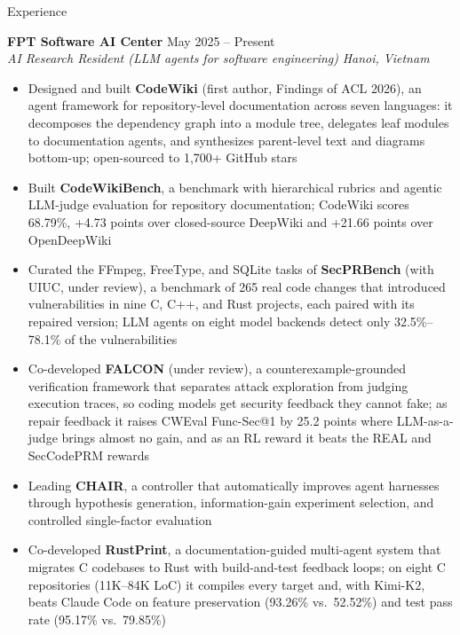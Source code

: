 \documentclass{resume} %
\begin{document}

\begin{rSection}{Experience}

\textbf{FPT Software AI Center} \hfill May 2025 -- Present\\
\textit{AI Research Resident (LLM agents for software engineering)}
\hfill \textit{Hanoi, Vietnam}

\begin{itemize}[leftmargin=1.5em,itemsep=0em,topsep=0.1em]
    \item Designed and built \textbf{CodeWiki} (first author, Findings of ACL
    2026), an agent framework for repository-level documentation across seven
    languages: it decomposes the dependency graph into a module tree, delegates
    leaf modules to documentation agents, and synthesizes parent-level text
    and diagrams bottom-up; open-sourced to 1,700+ GitHub stars
    \item Built \textbf{CodeWikiBench}, a benchmark with hierarchical rubrics
    and agentic LLM-judge evaluation for repository documentation; CodeWiki
    scores 68.79\%, +4.73 points over closed-source DeepWiki and +21.66 points
    over OpenDeepWiki
    \item Curated the FFmpeg, FreeType, and SQLite tasks of \textbf{SecPRBench}
    (with UIUC, under review), a benchmark of 265 real code changes that
    introduced vulnerabilities in nine C, C++, and Rust projects, each paired
    with its repaired version; LLM agents on eight model backends detect only
    32.5\%--78.1\% of the vulnerabilities
    \item Co-developed \textbf{FALCON} (under review), a
    counterexample-grounded verification framework that separates attack
    exploration from judging execution traces, so coding models get security
    feedback they cannot fake; as repair feedback it raises CWEval Func-Sec@1
    by 25.2 points where LLM-as-a-judge brings almost no gain, and as an RL
    reward it beats the REAL and SecCodePRM rewards
    \item Leading \textbf{CHAIR}, a controller that automatically improves agent
    harnesses through hypothesis generation, information-gain experiment
    selection, and controlled single-factor evaluation
    \item Co-developed \textbf{RustPrint}, a documentation-guided multi-agent
    system that migrates C codebases to Rust with build-and-test feedback
    loops; on eight C repositories (11K--84K LoC) it compiles every target and,
    with Kimi-K2, beats Claude Code on feature preservation (93.26\% vs.\
    52.52\%) and test pass rate (95.17\% vs.\ 79.85\%)
\end{itemize}


\end{rSection}
\end{document}
